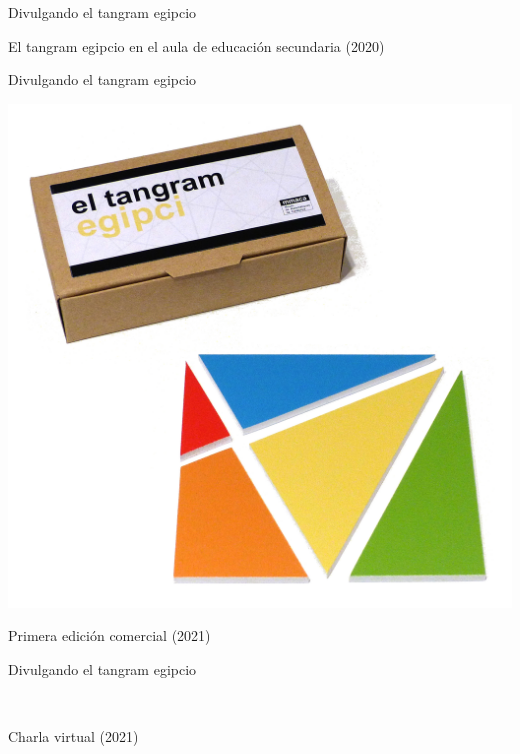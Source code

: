 \documentclass[14pt,aspectratio=169,usenames,dvipsnames]{beamer}
\begin{document}

    \begin{frame}{Divulgando el tangram egipcio}
        \begin{center}
            \begin{minipage}{0.5\textwidth}
                El tangram egipcio en el aula de educación secundaria (2020)
            \end{minipage}\quad\begin{minipage}{0.4\textwidth}
            \end{minipage}
        \end{center}
    \end{frame}


    \begin{frame}{Divulgando el tangram egipcio}
        \begin{center}
            \includegraphics[height=25ex]{pictures/Primera Edició.jpg} \\

            \bigskip

            Primera edición comercial (2021)
        \end{center}
    \end{frame}




    \begin{frame}{Divulgando el tangram egipcio}
        \begin{center}
             \\\medskip

            Charla virtual (2021)
        \end{center}
    \end{frame}
\end{document}
